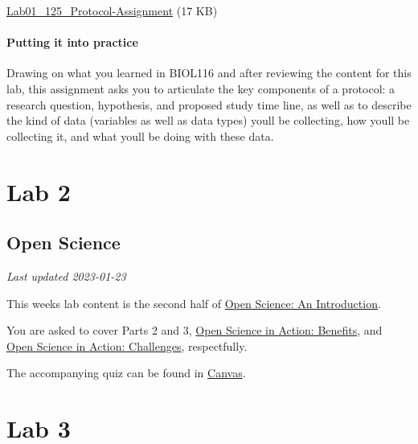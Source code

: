 \documentclass[
]{book}
\begin{document}
\href{https://osf.io/download/cnwkj}{Lab01\_125\_Protocol-Assignment} (17 KB)

\hypertarget{putting-it-into-practice}{%
\subsection*{Putting it into practice}\label{putting-it-into-practice}}

Drawing on what you learned in BIOL116 and after reviewing the content for this lab, this assignment asks you to articulate the key components of a protocol: a research question, hypothesis, and proposed study time line, as well as to describe the kind of data (variables as well as data types) you\textquotesingle ll be collecting, how you\textquotesingle ll be collecting it, and what you\textquotesingle ll be doing with these data.

\hypertarget{part-lab-2}{%
\part*{Lab 2}\label{part-lab-2}}

\hypertarget{open-science}{%
\chapter*{Open Science}\label{open-science}}

\emph{Last updated 2023-01-23}

This week\textquotesingle s lab content is the second half of \href{https://ubco-biology.github.io/OS-Introduction/}{Open Science: An Introduction}.

You are asked to cover Parts 2 and 3, \href{https://ubco-biology.github.io/OS-Introduction/open-science-in-action-benefits.html}{Open Science in Action: Benefits}, and \href{https://ubco-biology.github.io/OS-Introduction/open-science-in-action-challenges.html}{Open Science in Action: Challenges}, respectfully.

The accompanying quiz can be found in \href{https://canvas.ubc.ca/courses/90147}{Canvas}.

\hypertarget{part-lab-3}{%
\part*{Lab 3}\label{part-lab-3}}
\end{document}
